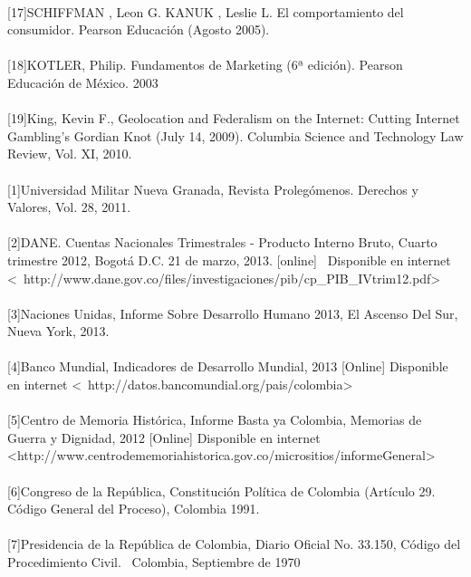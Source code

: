 \paragraph{}
[17]SCHIFFMAN , Leon G. KANUK , Leslie L. El comportamiento del consumidor. Pearson Educaci\'on (Agosto 2005).
\paragraph{}
[18]KOTLER, Philip. Fundamentos de Marketing (6ª edici\'on). Pearson Educaci\'on de M\'exico. 2003
\paragraph{}
[19]King, Kevin F., Geolocation and Federalism on the Internet: Cutting Internet Gambling’s Gordian Knot (July 14, 2009). Columbia Science and Technology Law Review, Vol. XI, 2010.
\paragraph{}
\paragraph{}
[1]Universidad Militar Nueva Granada, Revista Prolegómenos. Derechos y Valores, Vol. 28, 2011.
\paragraph{}
[2]DANE. Cuentas Nacionales Trimestrales - Producto Interno Bruto, Cuarto trimestre 2012, Bogotá D.C. 21 de marzo, 2013. [online]  Disponible en internet 
\textless  http://www.dane.gov.co/files/investigaciones/pib/cp_PIB_IVtrim12.pdf\textgreater
\paragraph{}
[3]Naciones Unidas, Informe Sobre Desarrollo Humano 2013, El Ascenso Del Sur, Nueva York, 2013.
\paragraph{}
[4]Banco Mundial, Indicadores de Desarrollo Mundial, 2013 [Online] Disponible en internet 
\textless  http://datos.bancomundial.org/pais/colombia\textgreater
\paragraph{}
[5]Centro de Memoria Histórica, Informe Basta ya Colombia, Memorias de Guerra y Dignidad, 2012 [Online] Disponible en internet 
\textless http://www.centrodememoriahistorica.gov.co/micrositios/informeGeneral\textgreater
\paragraph{}
[6]Congreso de la República, Constitución Política de Colombia (Artículo 29. Código General del Proceso), Colombia 1991.
\paragraph{}
[7]Presidencia de la República de Colombia, Diario Oficial No. 33.150, Código del Procedimiento Civil.  Colombia, Septiembre de 1970

\pagebreak